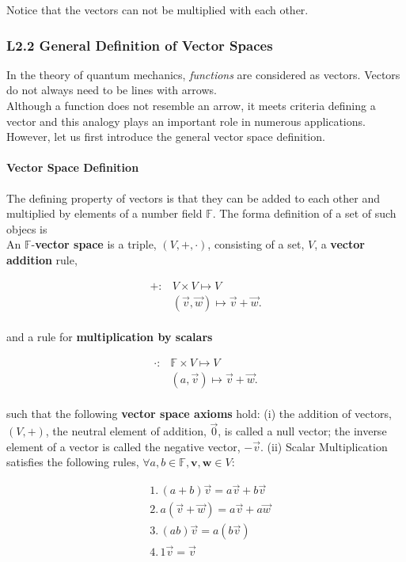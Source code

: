 \documentclass[11pt, oneside]{article}   	%
\begin{document}
  Notice that the vectors can not be multiplied with each other. 

\subsubsection{L2.2 General Definition of Vector Spaces}

In the theory of quantum mechanics, \textit{functions} are considered as
vectors. Vectors do not always need to be lines with arrows. \\

Although a function does not resemble an arrow, it meets criteria defining
a vector and this analogy plays an important role in numerous applications. \\

However, let us first introduce the general vector space definition. 

\paragraph{Vector Space Definition} 

The defining property of vectors is that they can be added to each other and
multiplied by elements of a number field $\mathbb{F}$. The forma definition of
a set of such objecs is \\
An $\mathbb{F}$-\textbf{vector space} is a triple, $(V, +, \cdot)$, consisting
of a set, $V$, a \textbf{vector addition} rule, 

\begin{align*}
  + : &V \times V \mapsto V \\
      &(\vec{v}, \vec{w} ) \mapsto \vec{v} + \vec{w}. 
\end{align*}\\ 

and a rule for \textbf{multiplication by scalars}

\begin{align*}
  \cdot :& \mathbb{F} \times V \mapsto V \\
  &(a, \vec{v}) \mapsto \vec{v} + \vec{w}. 
\end{align*}\\ 

such that the following \textbf{vector space axioms} hold: (i) the addition of
vectors, $(V,+)$, the neutral element of addition, $\vec{0}$, is called a null
vector; the inverse element of a vector is called the negative vector,
$-\vec{v}$. (ii) Scalar Multiplication satisfies the following rules, $\forall
a, b \in \mathbb{F}, \textbf{v}, \textbf{w} \in V$:

\begin{align*}
&1. \, (a+b)\vec{v} = a\vec{v}  + b\vec{v} \\
&2. \, a(\vec{v} + \vec{w}) = a\vec{v} + a\vec{w} \\
&3. \,(ab)\vec{v} = a(b\vec{v}) \\ 
&4. \,1\vec{v} = \vec{v}  
\end{align*}
\end{document}
